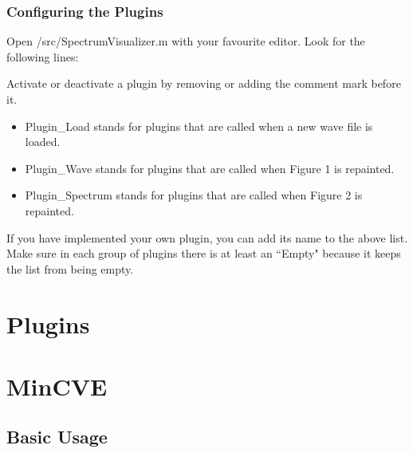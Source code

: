         \subsubsection{Configuring the Plugins}\indent
        
        Open /src/SpectrumVisualizer.m with your favourite editor. Look for the following lines:
        
        \lstset{language = octave, tabsize = 8}
        
        
        Activate or deactivate a plugin by removing or adding the comment mark before it.
        
        \begin{itemize}
                \item Plugin\_Load stands for plugins that are called when a new wave file is loaded.
                \item Plugin\_Wave stands for plugins that are called when Figure 1 is repainted.
                \item Plugin\_Spectrum stands for plugins that are called when Figure 2 is repainted.
        \end{itemize}
        
        If you have implemented your own plugin, you can add its name to the above list. Make sure in each group of plugins there is at least an ``Empty" because it keeps the list from being empty.

\section{Plugins}

\section{MinCVE}

\subsection{Basic Usage}


